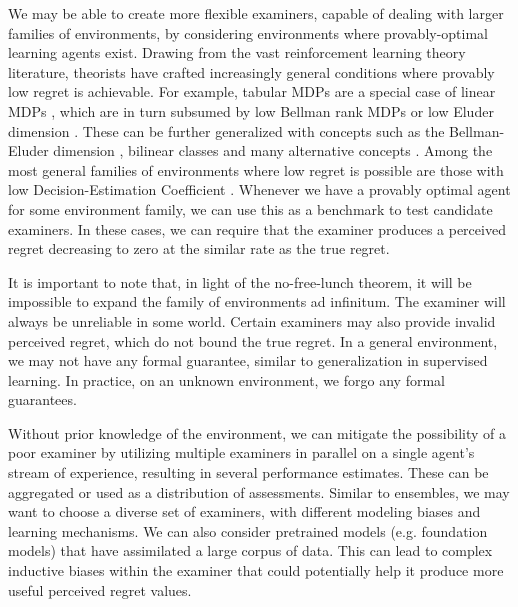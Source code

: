 We may be able to create more flexible examiners, capable of dealing with larger families of environments, by considering environments where provably-optimal learning agents exist. Drawing from the vast reinforcement learning theory literature, theorists have crafted increasingly general conditions where provably low regret is achievable. For example, tabular MDPs are a special case of linear MDPs \citep{jin2020provably}, which are in turn subsumed by low Bellman rank MDPs \citep{jiang2017contextual} or low Eluder dimension \citep{russo2013eluder}. These can be  further generalized with concepts such as the Bellman-Eluder dimension \citep{jin2021bellman}, bilinear classes \citep{du2021bilinear} and many alternative concepts \citep{ayoub2020model, sun2019model}. Among the most general families of environments where low regret is possible are those with low Decision-Estimation Coefficient \citep{foster2021statistical}. 
Whenever we have a provably optimal agent for some environment family, we can use this as a benchmark to test candidate examiners. In these cases, we can require that the examiner produces a perceived regret decreasing to zero at the similar rate as the true regret. 

It is important to note that, in light of the no-free-lunch theorem, it will be impossible to expand the family of environments ad infinitum. The examiner will always be unreliable in some world. 
Certain examiners may also provide invalid perceived regret, which do not bound the true regret. In a general environment, we may not have any formal guarantee, similar to generalization in supervised learning. In practice, on an unknown environment, we forgo any formal guarantees. 

Without prior knowledge of the environment, we can mitigate the possibility of a poor examiner by utilizing multiple examiners in parallel on a single agent's stream of experience, resulting in several performance estimates. These can be aggregated or used as a distribution of assessments. Similar to ensembles, we may want to choose a diverse set of examiners, with different modeling biases and learning mechanisms. 
We can also consider pretrained models (e.g. foundation models) that have assimilated a large corpus of data. This can lead to complex inductive biases within the examiner that could potentially help it produce more useful perceived regret values. 






